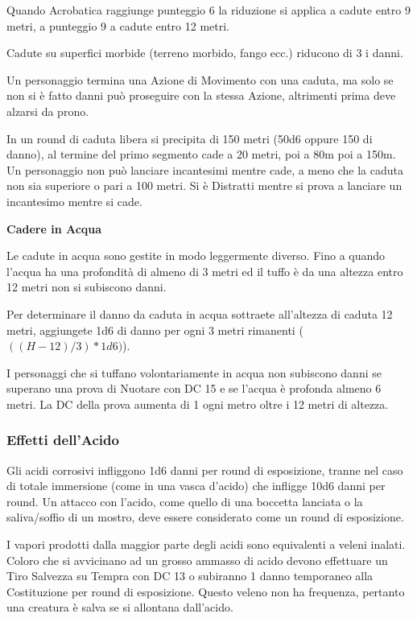 \begin{multicols}{2}
Quando Acrobatica raggiunge punteggio 6 la riduzione si applica a cadute entro 9 metri, a punteggio 9 a cadute entro 12 metri.

Cadute su superfici morbide (terreno morbido, fango ecc.) riducono di 3 i danni.

Un personaggio termina una Azione di Movimento con una caduta, ma solo se non si è fatto danni può proseguire con la stessa Azione, altrimenti prima deve alzarsi da prono.

In un round di caduta libera si precipita di 150 metri (50d6 oppure 150 di danno), al termine del primo segmento cade a 20 metri, poi a 80m poi a 150m. Un personaggio non può lanciare incantesimi mentre cade, a meno che la caduta non sia superiore o pari a 100 metri. Si è Distratti mentre si prova a lanciare un incantesimo mentre si cade.

\medskip

\noindent \textbf{Cadere in Acqua}

Le cadute in acqua sono gestite in modo leggermente diverso. Fino a quando l'acqua ha una profondità di almeno di 3 metri ed il tuffo è da una altezza entro 12 metri non si subiscono danni.

Per determinare il danno da caduta in acqua sottraete all'altezza di caduta 12 metri, aggiungete 1d6 di danno per ogni 3 metri rimanenti ($((H-12)/3)*1d6)$).

I personaggi che si tuffano volontariamente in acqua non subiscono danni se superano una prova di Nuotare con DC 15 e se l'acqua è profonda almeno 6 metri. La DC della prova aumenta di 1 ogni metro oltre i 12 metri di altezza.

\subsubsection{Effetti dell'Acido}

\label{effetti-dellacido}

Gli acidi corrosivi infliggono 1d6 danni per round di esposizione, tranne nel caso di totale immersione (come in una vasca d'acido) che infligge 10d6 danni per round. Un attacco con l'acido, come quello di una boccetta lanciata o la saliva/soffio di un mostro, deve essere considerato come un round di esposizione.

I vapori prodotti dalla maggior parte degli acidi sono equivalenti a veleni inalati. Coloro che si avvicinano ad un grosso ammasso di acido devono effettuare un Tiro Salvezza su Tempra con DC 13 o subiranno 1 danno temporaneo alla Costituzione per round di esposizione. Questo veleno non ha frequenza, pertanto una creatura è salva se si allontana dall'acido.


\end{multicols}
